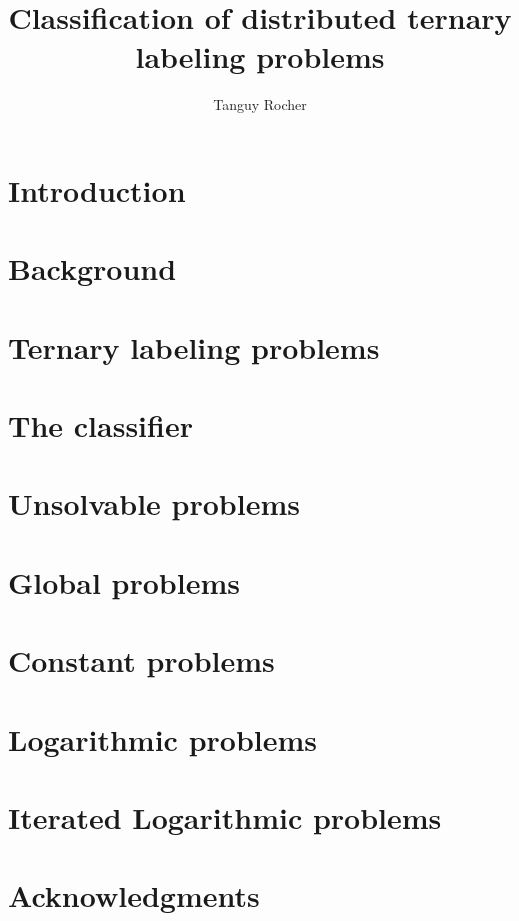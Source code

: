 
\title{Classification of distributed ternary labeling problems}
\author{Tanguy Rocher}



\maketitle

\tableofcontents
\newpage

\chapter{Introduction}


\chapter{Background}


\chapter{Ternary labeling problems}


\newpage
\chapter{The classifier}


\newpage
\chapter{Unsolvable problems}


\newpage
\chapter{Global problems}


\newpage
\chapter{Constant problems}


\newpage
\chapter{Logarithmic problems}


\newpage
\chapter{Iterated Logarithmic problems}


\chapter{Acknowledgments}




